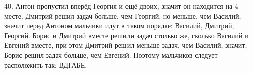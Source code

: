 40. Антон пропустил вперёд Георгия и ещё двоих, значит он находится на 4 месте. Дмитрий решил задач больше, чем Георгий, но меньше, чем Василий, значит перед Антоном мальчики идут в таком порядке: Василий, Дмитрий, Георгий. Борис и Дмитрий вместе решили задач столько же, сколько Василий и Евгений вместе, при этом Дмитрий решил меньше задач, чем Василий, значит, Борис решил задач больше, чем Евгений. Поэтому мальчиков следует расположить так: ВДГАБЕ.\\
